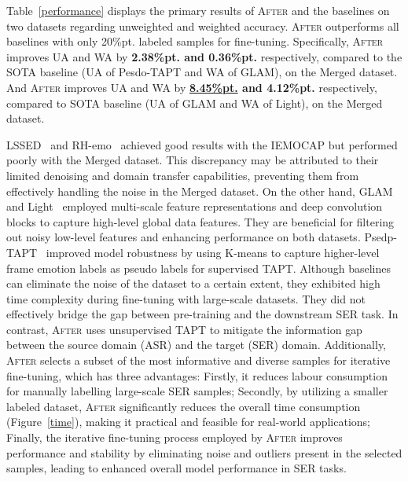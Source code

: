 \documentclass{article}
\begin{document}
Table~\ref{performance} displays the primary results of \textsc{After} and the baselines on two datasets regarding unweighted and weighted accuracy. \textsc{After} outperforms all baselines with only 20\%pt. labeled samples for fine-tuning. Specifically, \textsc{After} improves UA and WA by \textbf{2.38\%pt. and 0.36\%pt.} respectively, compared to the SOTA baseline (UA of Pesdo-TAPT and WA of GLAM), on the Merged dataset. And \textsc{After} improves UA and WA by \textbf{\underline{8.45\%pt.} and 4.12\%pt.} respectively, compared to SOTA baseline (UA of GLAM and WA of Light), on the Merged dataset.


LSSED~\cite{9414542} and RH-emo~\cite{abs-2204-02385} achieved good results with the IEMOCAP but performed poorly with the Merged dataset. This discrepancy may be attributed to their limited denoising and domain transfer capabilities, preventing them from effectively handling the noise in the Merged dataset. On the other hand, GLAM~\cite{9747517} and Light~\cite{Aftab} employed multi-scale feature representations and deep convolution blocks to capture high-level global data features. They are beneficial for filtering out noisy low-level features and enhancing performance on both datasets. Psedp-TAPT~\cite{2110-06309} improved model robustness by using K-means to capture higher-level frame emotion labels as pseudo labels for supervised TAPT. Although baselines can eliminate the noise of the dataset to a certain extent, they exhibited high time complexity during fine-tuning with large-scale datasets. They did not effectively bridge the gap between pre-training and the downstream SER task. In contrast, \textsc{After} uses unsupervised TAPT to mitigate the information gap between the source domain (ASR) and the target (SER) domain. Additionally, \textsc{After} selects a subset of the most informative and diverse samples for iterative fine-tuning, which has three advantages: Firstly, it reduces labour consumption for manually labelling large-scale SER samples; Secondly, by utilizing a smaller labeled dataset, \textsc{After} significantly reduces the overall time consumption (Figure~\ref{time}), making it practical and feasible for real-world applications; Finally, the iterative fine-tuning process employed by \textsc{After} improves performance and stability by eliminating noise and outliers present in the selected samples, leading to enhanced overall model performance in SER tasks.
\end{document}
